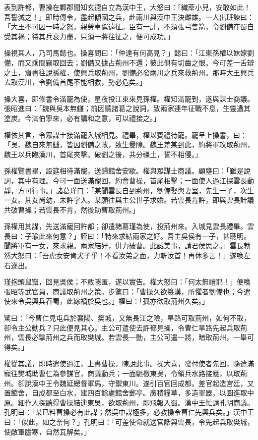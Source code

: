 表到許都，曹操在鄴郡聞知玄德自立為漢中王，大怒曰：「織蓆小兒，安敢如此！吾誓滅之！」即時傳令，盡起傾國之兵，赴兩川與漢中王決雌雄。一人出班諫曰：「大王不可因一時之怒，親勞車駕遠征。臣有一計，不須張弓隻箭，令劉備在蜀自受其禍；待其兵衰力盡，只須一將往征之，便可成功。」

操視其人，乃司馬懿也。操喜問曰：「仲達有何高見？」懿曰：「江東孫權以妹嫁劉備，而又乘間竊取回去；劉備又據占荊州不還；彼此俱有切齒之恨。今可差一舌辯之士，齎書往說孫權，使興兵取荊州，劉備必發兩川之兵來救荊州。那時大王興兵去取漢川，令劉備首尾不能相救，勢必危矣。」

操大喜，即修書令滿寵為使，星夜投江東來見孫權。權知滿寵到，遂與謀士商議。張昭進曰：「魏與吳本無讎；前因聽諸葛之說詞，致兩家連年征戰不息，生靈遭其塗炭。今滿伯寧來，必有講和之意，可以禮接之。」

權依其言，令眾謀士接滿寵入城相見。禮畢，權以賓禮待寵。寵呈上操書，曰：「吳、魏自來無讎，皆因劉備之故，致生釁隙。魏王差某到此，約將軍攻取荊州，魏王以兵臨漢川，首尾夾擊。破劉之後，共分疆土，誓不相侵。」

孫權覽書畢，設筵相待滿寵，送歸館舍安歇。權與眾謀士商議。顧壅曰：「雖是說詞，其中有理。今可一面送滿寵回，約會曹操，首尾相擊；一面使人過江探雲長動靜，方可行事。」諸葛瑾曰：「某聞雲長自到荊州，劉備娶與妻室，先生一子，次生一女。其女尚幼，未許字人。某願往與主公世子求婚。若雲長肯許，即與雲長計議共破曹操；若雲長不肯，然後助曹取荊州。」

孫權用其謀，先送滿寵回許都；卻遣諸葛瑾為使，投荊州來。入城見雲長禮畢。雲長曰：子瑜此來何意？」謹曰：「特來求結兩家之好。吾主吳侯有一子，甚聰明。聞將軍有一女，來求親。兩家結好，併力破曹。此誠美事，請君侯思之。」雲長勃然大怒曰：「吾虎女安肯犬子乎！不看汝弟之面，力斬汝首！再休多言！」遂喚左右逐出。

瑾抱頭鼠竄，回見吳侯；不敢隱匿，遂以實告。權大怒曰：「何太無禮耶！」便喚張昭等武官員，商議取荊州之策。步騭曰：「曹操久欲篡漢，所懼者劉備也；今遣使來令吳興兵吞蜀，此嫁禍於吳也。」權曰：「孤亦欲取荊州久矣。」

騭曰：「今曹仁見屯兵於襄陽、樊城，又無長江之險，旱路可取荊州，如何不取，卻令主公動兵？只此便見其心。主公可遣使去許都見操，令曹仁旱路先起兵取荊州，雲長必掣荊州之兵而取樊城。若雲長一動，主公可遣一將，暗取荊州，一舉可得矣。」

權從其議，即時遣使過江，上書曹操，陳說此事。操大喜，發付使者先回，隨遣滿寵往樊城助曹仁為參謀官，商議動兵；一面馳檄東吳，令領兵水路接應，以取荊州。卻說漢中王令魏延總督軍馬，守禦東川。遂引百官回成都。差官起造宮廷，又置館舍，自成都至白水，建四百餘處館舍郵亭。廣積糧草，多造軍器，以圖進取中原。細作人探聽得曹操結連東吳，欲取荊州，即飛報入蜀。漢中王忙請孔明商議。孔明曰：「某已料曹操必有此謀；然吳中謀極多，必教操令曹仁先興兵矣。」漢中王曰：「似此，如之奈何？」孔明曰：「可差使命就送官誥與雲長，令先起兵取樊城，使敵軍膽寒，自然瓦解矣。」

